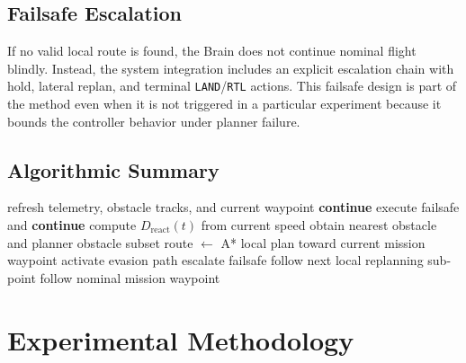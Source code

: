 \documentclass[a4paper,11pt]{article}
\begin{document}
\subsection{Failsafe Escalation}

If no valid local route is found, the Brain does not continue nominal flight blindly. Instead, the system integration includes an explicit escalation chain with hold, lateral replan, and terminal \texttt{LAND}/\texttt{RTL} actions. This failsafe design is part of the method even when it is not triggered in a particular experiment because it bounds the controller behavior under planner failure.

\subsection{Algorithmic Summary}

\begin{algorithm}[t]
    \caption{Simplified control loop for the proposed method integrated in Pipeline A}
    \label{alg:replanner}
    \small
    \begin{algorithmic}[1]
            \State refresh telemetry, obstacle tracks, and current waypoint
                \State \textbf{continue}
            \EndIf
                \State execute failsafe and \textbf{continue}
            \EndIf
            \State compute \(D_{\mathrm{react}}(t)\) from current speed
            \State obtain nearest obstacle and planner obstacle subset
                \State route \(\gets\) A* local plan toward current mission waypoint
                    \State activate evasion path
                \Else
                    \State escalate failsafe
                \EndIf
            \EndIf
                \State follow next local replanning sub-point
            \Else
                \State follow nominal mission waypoint
            \EndIf
        \EndWhile
    \end{algorithmic}
\end{algorithm}

\section{Experimental Methodology}
\end{document}
